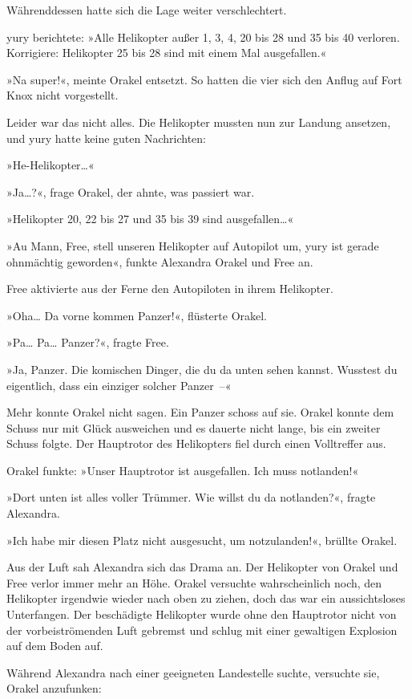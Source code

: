 Währenddessen hatte sich die Lage weiter verschlechtert.

yury berichtete: »Alle Helikopter außer 1, 3, 4, 20 bis 28 und 35 bis 40 verloren. Korrigiere: Helikopter 25 bis 28 sind mit einem Mal ausgefallen.«

»Na super!«, meinte Orakel entsetzt. So hatten die vier sich den Anflug auf Fort Knox nicht vorgestellt.

Leider war das nicht alles. Die Helikopter mussten nun zur Landung ansetzen, und yury hatte keine guten Nachrichten:

»He-Helikopter…«

»Ja…?«, frage Orakel, der ahnte, was passiert war.

»Helikopter 20, 22 bis 27 und 35 bis 39 sind ausgefallen…«

»Au Mann, Free, stell unseren Helikopter auf Autopilot um, yury ist gerade ohnmächtig geworden«, funkte Alexandra Orakel und Free an.

Free aktivierte aus der Ferne den Autopiloten in ihrem Helikopter.

»Oha… Da vorne kommen Panzer!«, flüsterte Orakel.

»Pa… Pa… Panzer?«, fragte Free.

»Ja, Panzer. Die komischen Dinger, die du da unten sehen kannst. Wusstest du eigentlich, dass ein einziger solcher Panzer~–«

Mehr konnte Orakel nicht sagen. Ein Panzer schoss auf sie. Orakel konnte dem Schuss nur mit Glück ausweichen und es dauerte nicht lange, bis ein zweiter Schuss folgte. Der Hauptrotor des Helikopters fiel durch einen Volltreffer aus.

Orakel funkte: »Unser Hauptrotor ist ausgefallen. Ich muss notlanden!«

»Dort unten ist alles voller Trümmer. Wie willst du da notlanden?«, fragte Alexandra.

»Ich habe mir diesen Platz nicht ausgesucht, um notzulanden!«, brüllte Orakel.

Aus der Luft sah Alexandra sich das Drama an. Der Helikopter von Orakel und Free verlor immer mehr an Höhe. Orakel versuchte wahrscheinlich noch, den Helikopter irgendwie wieder nach oben zu ziehen, doch das war ein aussichtsloses Unterfangen. Der beschädigte Helikopter wurde ohne den Hauptrotor nicht von der vorbeiströmenden Luft gebremst und schlug mit einer gewaltigen Explosion auf dem Boden auf.

Während Alexandra nach einer geeigneten Landestelle suchte, versuchte sie, Orakel anzufunken:

